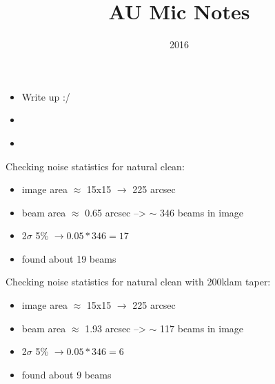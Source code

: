 \documentclass[a4paper]{tufte-handout}
\title{AU Mic Notes}
\date{2016}
\begin{document}
\maketitle


\begin{tasks}
	\begin{itemize}
		\item Write up :/
	\end{itemize}
\end{tasks}


\begin{maybe}
	\begin{itemize}
		\item
	\end{itemize}
\end{maybe}


\begin{mer}
	\begin{itemize}
		\item
	\end{itemize}

\end{mer}

Checking noise statistics for natural clean:\\
\begin{itemize}
  \item image area $\approx$ 15x15 $\to$ 225 arcsec
  \item beam area $\approx$ 0.65 arcsec --> $\sim$ 346 beams in image
  \item 2$\sigma$ 5\% $\to 0.05 * 346 = 17$
  \item found about 19 beams
\end{itemize}

\noindent Checking noise statistics for natural clean with 200klam taper:\\
\begin{itemize}
  \item image area $\approx$ 15x15 $\to$ 225 arcsec
  \item beam area $\approx$ 1.93 arcsec --> $\sim$ 117 beams in image
  \item 2$\sigma$ 5\% $\to 0.05 * 346 = 6$
  \item found about 9 beams
\end{itemize}
\end{document}
